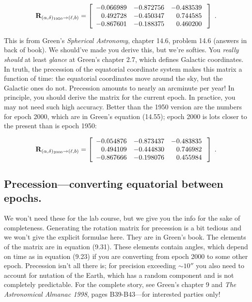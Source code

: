 \documentclass[11pt,preprint]{aastex}
\begin{document}
\begin{mathletters} 
\begin{eqnarray} 
{\bf R}_{(\alpha, \delta)_{1950} \rightarrow (\ell, b)} = \left[ 
\begin{array}{rrr}
   -0.066989 &  -0.872756 &  -0.483539 \\
    0.492728 &  -0.450347 &   0.744585 \\
   -0.867601 &  -0.188375 &   0.460200 \\
 \end{array} 
\; \right] \; .
\end{eqnarray} 

\noindent This is from Green's {\it Spherical Astronomy}, chapter 14.6,
problem 14.6 (answers in back of book).  We should've made you derive
this, but we're softies.  You {\it really should} at least {\it glance}
at Green's chapter 2.7, which defines Galactic coordinates.  In truth,
the precession of the equatorial coordinate system makes this matrix a
function of time: the equatorial coordinates move around the sky, but
the Galactic ones do not.  Precession amounts to nearly an arcminute per
year! In principle, you should derive the matrix for the current epoch. 
In practice, you may not need such high accuracy.  Better than the 1950
version are the numbers for epoch 2000, which are in Green's equation
(14.55); epoch 2000 is lots closer to the present than is epoch 1950:

\begin{eqnarray} 
{\bf R}_{(\alpha, \delta)_{2000} \rightarrow (\ell, b)} = \left[ 
\begin{array}{rrr}
   -0.054876 &  -0.873437 &  -0.483835 \\
    0.494109 &  -0.444830 &   0.746982 \\
   -0.867666 &  -0.198076 &   0.455984 \\
\end{array} 
\; \right] \; .
\end{eqnarray} 
\end{mathletters} 

\subsection {Precession---converting equatorial between epochs.}

	We won't need these for the lab course, but we give you the info
for the sake of completeness.  Generating the rotation matrix for
precession is a bit tedious and we won't give the explicit formulae
here.  They are in Green's book.  The elements of the matrix are in
equation (9.31).  These elements contain angles, which depend on time as
in equation (9.23) if you are converting from epoch 2000 to some other
epoch.  Precession isn't all there is; for precision exceeding $\sim
10''$ you also need to account for nutation of the Earth, which has a
random component and is not completely predictable.  For the complete
story, see Green's chapter 9 and {\it The Astronomical Almanac 1998}, 
pages B39-B43---for interested parties only!
\end{document}
